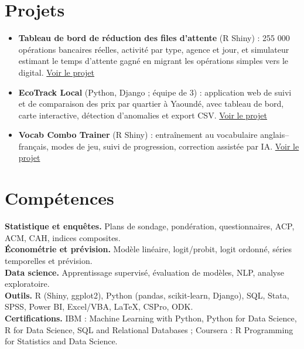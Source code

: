 \documentclass[10pt,a4paper]{article}
\newcommand{\lnk}[2]{\href{#1}{\color{olive}#2}}
\begin{document}
\section{Projets}
\begin{itemize}
\item \textbf{Tableau de bord de r\'eduction des files d'attente} (R Shiny) : 255 000 op\'erations bancaires r\'eelles, activit\'e par type, agence et jour, et simulateur estimant le temps d'attente gagn\'e en migrant les op\'erations simples vers le digital. \lnk{https://joris-nitiema.github.io/fr/projects/queue-dashboard/}{Voir le projet}
\item \textbf{EcoTrack Local} (Python, Django ; \'equipe de 3) : application web de suivi et de comparaison des prix par quartier \`a Yaound\'e, avec tableau de bord, carte interactive, d\'etection d'anomalies et export CSV. \lnk{https://joris-nitiema.github.io/fr/projects/ecotrack/}{Voir le projet}
\item \textbf{Vocab Combo Trainer} (R Shiny) : entra\^inement au vocabulaire anglais--fran\c{c}ais, modes de jeu, suivi de progression, correction assist\'ee par IA. \lnk{https://joris-nitiema.github.io/fr/projects/vocab-trainer/}{Voir le projet}
\end{itemize}

\section{Comp\'etences}
\textbf{Statistique et enqu\^etes.} Plans de sondage, pond\'eration, questionnaires, ACP, ACM, CAH, indices composites.\\
\textbf{\'Econom\'etrie et pr\'evision.} Mod\`ele lin\'eaire, logit/probit, logit ordonn\'e, s\'eries temporelles et pr\'evision.\\
\textbf{Data science.} Apprentissage supervis\'e, \'evaluation de mod\`eles, NLP, analyse exploratoire.\\
\textbf{Outils.} R (Shiny, ggplot2), Python (pandas, scikit-learn, Django), SQL, Stata, SPSS, Power BI, Excel/VBA, \LaTeX, CSPro, ODK.\\
\textbf{Certifications.} IBM : Machine Learning with Python, Python for Data Science, R for Data Science, SQL and Relational Databases ; Coursera : R Programming for Statistics and Data Science.
\end{document}
